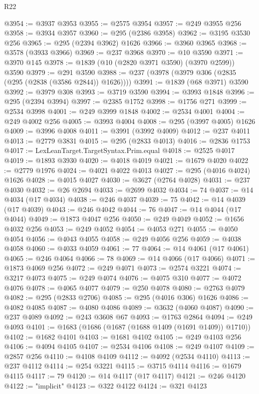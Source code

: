 \begin{lexlean}{R22}
\begin{coremodule}
@3954 := @3937 @3953
@3955 := @2575 @3954
@3957 := @249 @3955 @256
@3958 := @3934 @3957
@3960 := @295 (@2386 @3958)
@3962 := @3195 @3530 @256
@3965 := @295 (@2394 @3962) @1626
@3966 := @3960 @3965
@3968 := @3578 (@3933 @3966)
@3969 := @237 @3968
@3970 := @10 @3590
@3971 := @3970 @145
@3978 := @1839 (@10 (@2820 @3971 @3590) (@3970 @2599)) @3590
@3979 := @291 @3590
@3988 := @237 (@3978 (@3979 @306 (@2835 (@295 (@2838 (@3586 @2844)) @1626))))
@3991 := @1839 (@68 @3971) @3590
@3992 := @3979 @308
@3993 := @3719 @3590
@3994 := @3993 @1848
@3996 := @295 (@2394 @3994)
@3997 := @2385 @1752
@3998 := @1756 @271
@3999 := @2534 @3998
@4001 := @249 @3999 @1848
@4002 := @2534 @4001
@4004 := @249 @4002 @256
@4005 := @3993 @4004
@4008 := @295 (@3997 @4005) @1626
@4009 := @3996 @4008
@4011 := @3991 (@3992 @4009)
@4012 := @237 @4011
@4013 := @2779 @3831
@4015 := @295 (@2833 @4013)
@4016 := @2836 @1753
@4017 := LexLeanTarget.TargetSyntax.Prim.equal
@4018 := @2525 @4017
@4019 := @1893 @3930
@4020 := @4018 @4019
@4021 := @1679 @4020
@4022 := @2779 @1976
@4024 := @4021 @4022 @4013
@4027 := @295 (@4016 @4024) @1626
@4028 := @4015 @4027
@4030 := @3627 (@2764 @4028)
@4031 := @237 @4030
@4032 := @26 @2694
@4033 := @2699 @4032
@4034 := 74
@4037 := @14 @4034 (@17 @4034)
@4038 := @246 @4037
@4039 := 75
@4042 := @14 @4039 (@17 @4039)
@4043 := @246 @4042
@4044 := 76
@4047 := @14 @4044 (@17 @4044)
@4049 := @1873 @4047 @256
@4050 := @249 @4049
@4052 := @1656 @4032 @256
@4053 := @249 @4052
@4054 := @4053 @271
@4055 := @4050 @4054
@4056 := @4043 @4055
@4058 := @249 @4056 @256
@4059 := @4038 @4058
@4060 := @4033 @4059
@4061 := 77
@4064 := @14 @4061 (@17 @4061)
@4065 := @246 @4064
@4066 := 78
@4069 := @14 @4066 (@17 @4066)
@4071 := @1873 @4069 @256
@4072 := @249 @4071
@4073 := @2574 @3221
@4074 := @3217 @4073
@4075 := @249 @4074
@4076 := @4075 @310
@4077 := @4072 @4076
@4078 := @4065 @4077
@4079 := @250 @4078
@4080 := @2763 @4079
@4082 := @295 (@2833 @2706)
@4085 := @295 (@4016 @306) @1626
@4086 := @4082 @4085
@4087 := @4080 @4086
@4089 := @3632 (@4060 @4087)
@4090 := @237 @4089
@4092 := @243 @3608 @67
@4093 := @1763 @2864
@4094 := @249 @4093
@4101 := @1683 (@1686 (@1687 (@1688 @1409 (@1691 @1409)) @1710))
@4102 := @1682 @4101
@4103 := @1681 @4102
@4105 := @249 @4103 @256
@4106 := @4094 @4105
@4107 := @2534 @4106
@4108 := @249 @4107
@4109 := @2857 @256
@4110 := @4108 @4109
@4112 := @4092 (@2534 @4110)
@4113 := @237 @4112
@4114 := @254 @3221
@4115 := @3715 @4114
@4116 := @1679 @4115
@4117 := 79
@4120 := @14 @4117 (@17 @4117)
@4121 := @246 @4120
@4122 := "implicit"
@4123 := @322 @4122
@4124 := @321 @4123

\end{coremodule}
\end{lexlean}
